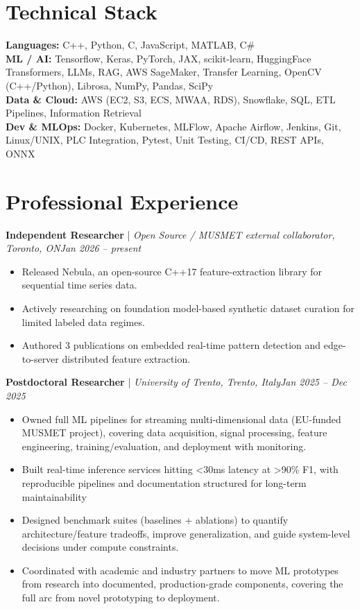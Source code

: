 \documentclass[11pt]{article}
\newenvironment{cvrole}[5]{%
  \par\noindent\textbf{\large #1} | \textit{\small #2, #3}\hfill \textit{\small #4 -- #5}\par
  \begin{itemize}[leftmargin=2em, itemsep=-0.3em, topsep=-0.5em]%
}{%
  \end{itemize}\par\noindent\mbox{}\par\vspace{0.1em}%
}
\begin{document}
\section*{Technical Stack}
\textbf{Languages:} C++, Python, C, JavaScript, MATLAB, C\#\\
\textbf{ML / AI:} Tensorflow, Keras, PyTorch, JAX, scikit-learn, HuggingFace Transformers, LLMs, RAG, AWS SageMaker, Transfer Learning, OpenCV (C++/Python), Librosa, NumPy, Pandas, SciPy\\
\textbf{Data \& Cloud:} AWS (EC2, S3, ECS, MWAA, RDS), Snowflake, SQL, ETL Pipelines, Information Retrieval\\
\textbf{Dev \& MLOps:} Docker, Kubernetes, MLFlow, Apache Airflow, Jenkins, Git, Linux/UNIX, PLC Integration, Pytest, Unit Testing, CI/CD, REST APIs, ONNX

\section*{Professional Experience}
\begin{cvrole}{Independent Researcher}{Open Source / MUSMET external collaborator}{Toronto, ON}{Jan 2026}{present}
    \item Released Nebula, an open-source C++17 feature-extraction library for sequential time series data.
    \item Actively researching on foundation model-based synthetic dataset curation for limited labeled data regimes.
    \item Authored 3 publications on embedded real-time pattern detection and edge-to-server distributed feature extraction.
\end{cvrole}

\begin{cvrole}{Postdoctoral Researcher}{University of Trento}{Trento, Italy}{Jan 2025}{Dec 2025}
    \item Owned full ML pipelines for streaming multi-dimensional data (EU-funded MUSMET project), covering data acquisition, signal processing, feature engineering, training/evaluation, and deployment with monitoring.
    \item Built real-time inference services hitting <30ms latency at >90\% F1, with reproducible pipelines and documentation structured for long-term maintainability
    \item Designed benchmark suites (baselines + ablations) to quantify architecture/feature tradeoffs, improve generalization, and guide system-level decisions under compute constraints.
    \item Coordinated with academic and industry partners to move ML prototypes from research into documented, production-grade components, covering the full arc from novel prototyping to deployment.
\end{cvrole}
\end{document}

